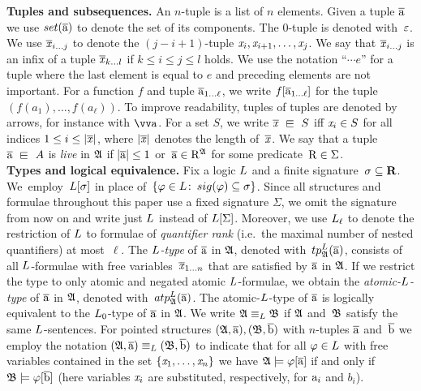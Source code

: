 \noindent \textbf{Tuples and subsequences.}
An $n$-tuple is a list of $n$ elements.
Given a tuple $\overline{\mathrm{a}}$ we use $\set(\elemtuplea)$ to denote the set of its components. 
The $0$-tuple is denoted with~$\varepsilon$.
We use $\overline{\mathit{x}}_{i\ldots j}$ to denote the $(j{-}i{+}1)$-tuple $\mathit{x}_i, \mathit{x}_{i+1}, \ldots, \mathit{x}_j$.
We say that $\overline{\mathit{x}}_{i\ldots j}$ is an infix of a tuple $\overline{\mathit{x}}_{k\ldots l}$ if $k \leq i \leq j \leq l$ holds.
We use the notation ``$\cdots e$'' for a tuple where the last element is equal to $e$ and preceding elements are not important.
For a function $f$ and tuple $\overline{\mathrm{a}}_{1\ldots\ell}$, we write $f[\overline{\mathrm{a}}_{1\ldots\ell}]$ for the tuple $(f(a_{1}), \ldots, f(a_{\ell}))$.
To improve readability, tuples of tuples are denoted by arrows, for instance with $\elemtuptuplea$.
For a set $S$, we write $\vartuplex \sqin S$ iff $\mathit{x}_i \in S$ for all indices $1 \leq i \leq |\overline{\mathit{x}}|$, where $|\overline{\mathit{x}}|$ denotes the length of~$\overline{\mathit{x}}$. 
We say that a tuple $\elemtuplea \sqin A$ is \emph{live} in ${\mathfrak{A}}$ if $|\overline{\mathrm{a}}| \leq 1$ or~$\overline{\mathrm{a}} \in \mathrm{R}^{{\mathfrak{A}}}$ for some predicate~$\mathrm{R} \in \Sigma$.\\

\noindent \textbf{Types and logical equivalence.}
Fix a logic $\logicL$ and a finite signature~$\sigma \subseteq \mathbf{R}$. 
We~employ~$\logicL[\sigma]$ in place of~$\{ \varphi \in \logicL \colon\,  \sig(\varphi) \subseteq \sigma \}$.
Since all structures and formulae throughout this paper use a fixed signature $\Sigma$, we omit the signature from now on and write just $\logicL$ instead of $\logicL[\Sigma]$.
Moreover, we use $\logicL_\ell$ to denote the restriction of $\logicL$ to formulae of \emph{quantifier rank} (i.e.\ the maximal number of nested quantifiers) at most~$\ell$.
%
The \emph{$\logicL$-type} of $\overline{\mathrm{a}}$ in ${\mathfrak{A}}$, denoted with~$\tp{\logicL}{\str{A}}{\elemtuplea}$, consists of all $\logicL$-formulae with free variables~$\overline{\mathit{x}}_{1\ldots n}$ that are satisfied by $\overline{\mathrm{a}}$ in ${\mathfrak{A}}$.
If we restrict the type to only atomic and negated atomic $\logicL$-formulae, we obtain the \emph{atomic-$\logicL$-type} of $\overline{\mathrm{a}}$ in ${\mathfrak{A}}$, denoted with~$\atp{\logicL}{\str{A}}{\elemtuplea}$.
The atomic-$\logicL$-type of $\overline{\mathrm{a}}$ is logically equivalent to the $\logicL_{0}$-type of $\overline{\mathrm{a}}$ in ${\mathfrak{A}}$.
We write $\str{A} \equiv_\logicL \str{B}$ if ${\mathfrak{A}}$ and~${\mathfrak{B}}$ satisfy the same $\logicL$-sentences.
For pointed structures $({\mathfrak{A}}, \overline{\mathrm{a}}), ({\mathfrak{B}}, \overline{\mathrm{b}})$ with $n$-tuples $\overline{\mathrm{a}}$ and~$\overline{\mathrm{b}}$ we employ the notation $(\str{A}, \elemtuplea) \equiv_\logicL (\str{B}, \elemtupleb)$ to indicate that for all $\varphi \in \logicL$ with free variables contained in the set $\{ \mathit{x}_1, \ldots, \mathit{x}_n \}$ we have ${\mathfrak{A}} \models \varphi[\overline{\mathrm{a}}]$ if and only if ${\mathfrak{B}} \models \varphi[\overline{\mathrm{b}}]$ (here variables $\mathit{x}_i$ are substituted, respectively, for $\mathrm{a}_i$ and $b_i$).\\

